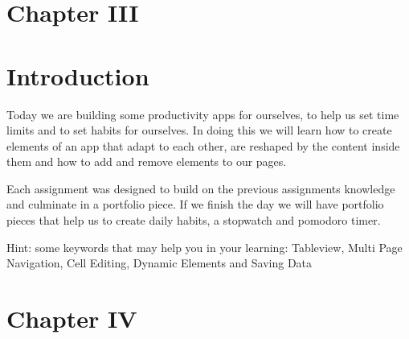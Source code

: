 \documentclass[12pt]{report}
\begin{document}
\vspace{\baselineskip}

\vspace{\baselineskip}



\newpage

\vspace{\baselineskip}
\vspace{\baselineskip}
\section*{Chapter III}
\section*{Introduction}

\vspace{\baselineskip}
Today we are building some productivity apps for ourselves, to help us set time limits and to set habits for ourselves. In doing this we will learn how to create elements of an app that adapt to each other, are reshaped by the content inside them and how to add and remove elements to our pages. \par


\vspace{\baselineskip}
Each assignment was designed to build on the previous assignments knowledge and culminate in a portfolio piece. If we finish the day we will have portfolio pieces that help us to create daily habits, a stopwatch and pomodoro timer. \par


\vspace{\baselineskip}
Hint: some keywords that may help you in your learning: Tableview, Multi Page Navigation, Cell Editing, Dynamic Elements and Saving Data\par


\vspace{\baselineskip}



\newpage

\vspace{\baselineskip}
\vspace{\baselineskip}
\section*{Chapter IV}
\end{document}
